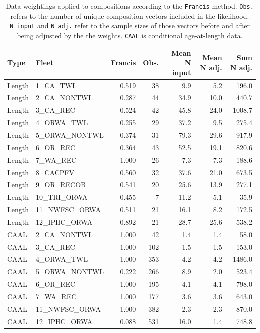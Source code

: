 \documentclass[
]{scrartcl}
\begin{document}
\begin{longtable}{llrrrrr}

\caption{\label{tbl-compweight}Data weightings applied to compositions
according to the \texttt{Francis} method. \texttt{Obs.} refers to the
number of unique composition vectors included in the likelihood.
\texttt{N\ input} and \texttt{N\ adj.} refer to the sample sizes of
those vectors before and after being adjusted by the the weights.
\texttt{CAAL} is conditional age-at-length data.}

\tabularnewline

\toprule
Type & Fleet & Francis & Obs. & Mean N input & Mean N adj. & Sum N adj. \\ 
\midrule\addlinespace[2.5pt]
Length & 1\_CA\_TWL & 0.519 & 38 & 9.9 & 5.2 & 196.0 \\ 
Length & 2\_CA\_NONTWL & 0.287 & 44 & 34.9 & 10.0 & 440.7 \\ 
Length & 3\_CA\_REC & 0.524 & 42 & 45.8 & 24.0 & 1008.7 \\ 
Length & 4\_ORWA\_TWL & 0.255 & 29 & 37.2 & 9.5 & 275.4 \\ 
Length & 5\_ORWA\_NONTWL & 0.374 & 31 & 79.3 & 29.6 & 917.9 \\ 
Length & 6\_OR\_REC & 0.364 & 43 & 52.5 & 19.1 & 820.6 \\ 
Length & 7\_WA\_REC & 1.000 & 26 & 7.3 & 7.3 & 188.6 \\ 
Length & 8\_CACPFV & 0.560 & 32 & 37.6 & 21.0 & 673.5 \\ 
Length & 9\_OR\_RECOB & 0.541 & 20 & 25.6 & 13.9 & 277.1 \\ 
Length & 10\_TRI\_ORWA & 0.455 & 7 & 11.2 & 5.1 & 35.9 \\ 
Length & 11\_NWFSC\_ORWA & 0.511 & 21 & 16.1 & 8.2 & 172.5 \\ 
Length & 12\_IPHC\_ORWA & 0.892 & 21 & 28.7 & 25.6 & 538.2 \\ 
CAAL & 2\_CA\_NONTWL & 1.000 & 42 & 1.4 & 1.4 & 58.0 \\ 
CAAL & 3\_CA\_REC & 1.000 & 102 & 1.5 & 1.5 & 153.0 \\ 
CAAL & 4\_ORWA\_TWL & 1.000 & 353 & 4.2 & 4.2 & 1486.0 \\ 
CAAL & 5\_ORWA\_NONTWL & 0.222 & 266 & 8.9 & 2.0 & 523.4 \\ 
CAAL & 6\_OR\_REC & 1.000 & 195 & 4.1 & 4.1 & 798.0 \\ 
CAAL & 7\_WA\_REC & 1.000 & 177 & 3.6 & 3.6 & 643.0 \\ 
CAAL & 11\_NWFSC\_ORWA & 1.000 & 382 & 2.3 & 2.3 & 870.0 \\ 
CAAL & 12\_IPHC\_ORWA & 0.088 & 531 & 16.0 & 1.4 & 748.8 \\ 
\bottomrule

\end{longtable}
\end{document}
